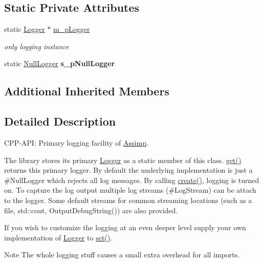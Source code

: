 \subsection*{Static Private Attributes}
\begin{DoxyCompactItemize}
\item 
static \hyperlink{class_assimp_1_1_logger}{Logger} $\ast$ \hyperlink{class_assimp_1_1_default_logger_ac0171ff2eb01b9f101f61ca2cf6785bb}{m\+\_\+p\+Logger}\hypertarget{class_assimp_1_1_default_logger_ac0171ff2eb01b9f101f61ca2cf6785bb}{}\label{class_assimp_1_1_default_logger_ac0171ff2eb01b9f101f61ca2cf6785bb}

\begin{DoxyCompactList}\small\item\em only logging instance \end{DoxyCompactList}\item 
static \hyperlink{class_assimp_1_1_null_logger}{Null\+Logger} {\bfseries s\+\_\+p\+Null\+Logger}\hypertarget{class_assimp_1_1_default_logger_acf6fae3e53fe5ff63fddc00868f821d2}{}\label{class_assimp_1_1_default_logger_acf6fae3e53fe5ff63fddc00868f821d2}

\end{DoxyCompactItemize}
\subsection*{Additional Inherited Members}


\subsection{Detailed Description}
C\+P\+P-\/\+A\+PI\+: Primary logging facility of \hyperlink{namespace_assimp}{Assimp}. 

The library stores its primary \hyperlink{class_assimp_1_1_logger_a784e6d1a741072b17bab32a6a41055e8}{Logger} as a static member of this class. \hyperlink{class_assimp_1_1_default_logger_a7d0a53f2db66945ade30094330a77ba4}{get()} returns this primary logger. By default the underlying implementation is just a \#\+Null\+Logger which rejects all log messages. By calling \hyperlink{class_assimp_1_1_default_logger_adccb11f85f8b0ef226c382e11ba665c3}{create()}, logging is turned on. To capture the log output multiple log streams (\#\+Log\+Stream) can be attach to the logger. Some default streams for common streaming locations (such as a file, std\+::cout, Output\+Debug\+String()) are also provided.

If you wish to customize the logging at an even deeper level supply your own implementation of \hyperlink{class_assimp_1_1_logger_a784e6d1a741072b17bab32a6a41055e8}{Logger} to \hyperlink{class_assimp_1_1_default_logger_a9daba548026045b99813c760c2842ed2}{set()}. \begin{DoxyNote}{Note}
The whole logging stuff causes a small extra overhead for all imports. 
\end{DoxyNote}


